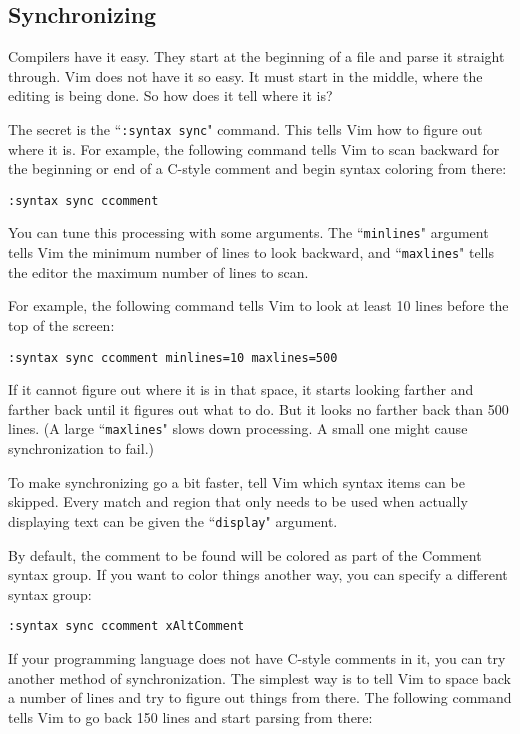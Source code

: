 \subsection{Synchronizing}
Compilers have it easy.
They start at the beginning of a file and parse it straight through.
Vim does not have it so easy.
It must start in the middle, where the editing is being done.
So how does it tell where it is?

The secret is the ``\texttt{:syntax sync}" command.
This tells Vim how to figure out where it is.
For example, the following command tells Vim to scan backward for the beginning or end of a C-style comment and begin syntax coloring from there:

\begin{Verbatim}[samepage=true]
 :syntax sync ccomment
\end{Verbatim}

You can tune this processing with some arguments.
The ``\texttt{minlines}" argument tells Vim the minimum number of lines to look backward, and ``\texttt{maxlines}" tells the editor the maximum number of lines to scan.

For example, the following command tells Vim to look at least 10 lines before the top of the screen:

\begin{Verbatim}[samepage=true]
 :syntax sync ccomment minlines=10 maxlines=500
\end{Verbatim}

If it cannot figure out where it is in that space, it starts looking farther and farther back until it figures out what to do.
But it looks no farther back than 500 lines.
(A large ``\texttt{maxlines}" slows down processing.
A small one might cause synchronization to fail.)

To make synchronizing go a bit faster, tell Vim which syntax items can be skipped.
Every match and region that only needs to be used when actually displaying text can be given the ``\texttt{display}" argument.

By default, the comment to be found will be colored as part of the Comment syntax group.
If you want to color things another way, you can specify a different syntax group:

\begin{Verbatim}[samepage=true]
 :syntax sync ccomment xAltComment
\end{Verbatim}

If your programming language does not have C-style comments in it, you can try another method of synchronization.
The simplest way is to tell Vim to space back a number of lines and try to figure out things from there.
The following command tells Vim to go back 150 lines and start parsing from there:

